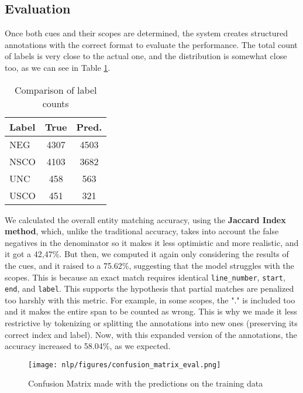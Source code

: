 \documentclass[9pt,a4paper,twoside]{tau-class/tau}
\begin{document}
    \subsection{Evaluation}
        Once both cues and their scopes are determined, the system creates structured annotations with the correct format to evaluate the performance. The total count of labels is very close to the actual one, and the distribution is somewhat close too, as we can see in Table \ref{fig:label_counts}. 
        \newline
        \begin{table}[h!]
            \centering     
            \begin{tabular}{|l|c|c|} %
            \hline
            \centering
            Label & True & Pred. \\ \hline
            NEG & 4307 & 4503 \\ \hline
            NSCO & 4103 & 3682 \\ \hline
            UNC & 458 & 563 \\ \hline
            USCO & 451 & 321 \\ \hline
            \end{tabular}
            \caption{Comparison of label counts}
        \label{fig:label_counts}
        \end{table}

        We calculated the overall entity matching accuracy, using the \textbf{Jaccard Index method}, which, unlike the traditional accuracy, takes into account the false negatives in the denominator so it makes it less optimistic and more realistic, and it got a 42,47\%. But then, we computed it again only considering the results of the cues, and it raised to a 75.62\%, suggesting that the model struggles with the scopes. This is because an exact match requires identical \lstinline|line_number|, \lstinline|start|, \lstinline|end|, and \lstinline|label|. This supports the hypothesis that partial matches are penalized too harshly with this metric. For example, in some scopes, the "." is included too and it makes the entire span to be counted as wrong. This is why we made it less restrictive by tokenizing or splitting the annotations into new ones (preserving its correct index and label). Now, with this expanded version of the annotations, the accuracy increased to 58.04\%, as we expected.
        \newline
        
        \begin{figure}[H]
            \centering
            \texttt{[image: nlp/figures/confusion\_matrix\_eval.png]}
            \caption{Confusion Matrix made with the predictions on the training data}
            \label{fig:confusion_matrix_eval}
        \end{figure} 
\end{document}
